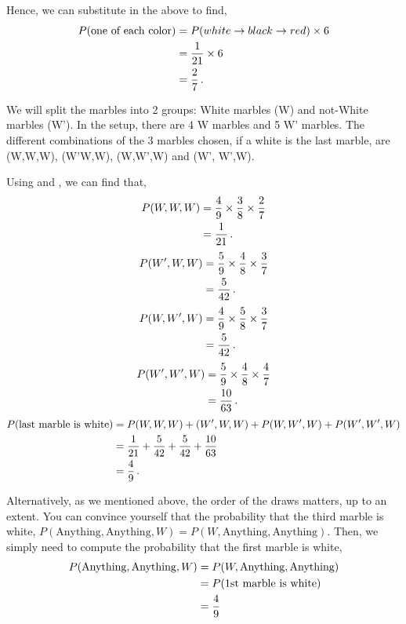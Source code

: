 \begin{subquestions}
\begin{subsubquestions}
Hence, we can substitute in the above to find,
\begin{align}
	P(\text{one of each color}) & = P(white \rightarrow black \rightarrow red) \times 6 \nonumber \\
	                     & = \frac{1}{21} \times 6 \nonumber \\
	                     & = \frac{2}{7} \,.
\end{align}



\subsubquestion

We will split the marbles into 2 groups: White marbles (W) and not-White marbles (W'). In the setup, there are 4 W marbles and 5 W' marbles. The different combinations of the 3 marbles chosen, if a white is the last marble, are (W,W,W), (W'W,W), (W,W',W) and (W', W',W). 

Using  and , we can find that,
\begin{align}
	P(W,W,W) & = \frac{4}{9} \times \frac{3}{8} \times \frac{2}{7} \nonumber \\
	         & = \frac{1}{21} \,.
\end{align}
\begin{align}
	P(W',W,W) & = \frac{5}{9} \times \frac{4}{8} \times \frac{3}{7} \nonumber \\
              & = \frac{5}{42} \,.
\end{align}
\begin{align}
	P(W,W',W) & = \frac{4}{9} \times \frac{5}{8} \times \frac{3}{7} \nonumber \\
			  & = \frac{5}{42} \,. 
\end{align}
\begin{align}
	P(W',W',W)& = \frac{5}{9} \times \frac{4}{8} \times \frac{4}{7} \nonumber \\
			  & = \frac{10}{63} \,.
\end{align}
\begin{align}
	P(\text{last marble is white}) & = P(W,W,W)+(W',W,W)+P(W,W',W)+P(W',W',W) \nonumber \\
	& = \frac{1}{21} + \frac{5}{42} + \frac{5}{42} + \frac{10}{63} \nonumber \\
	                               & = \frac{4}{9} \,.
\end{align}

Alternatively, as we mentioned above, the order of the draws matters, up to an extent. You can convince yourself that the probability that the third marble is white, $P(\text{Anything},\text{Anything},W) =P(W,\text{Anything},\text{Anything})$. Then, we simply need to compute the probability that the first marble is white,
\begin{align}
	P(\text{Anything},\text{Anything},W) &=P(W,\text{Anything},\text{Anything}) \nonumber\\
	&= P(\text{1st marble is white}) \nonumber\\
	&= \frac{4}{9}
\end{align}

\end{subsubquestions}

\end{subquestions}